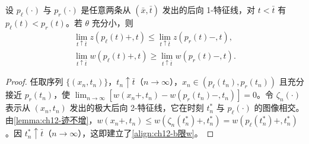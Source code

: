 \documentclass[../../main.tex]{subfiles}
\begin{document}
\begin{lemma}\label{lemma:ch12-后向特征极限}
设 $p_\ell(\cdot)$ 与 $p_r(\cdot)$ 是任意两条从 $(\bar x,\bar t)$ 发出的后向 1-特征线，对 $t<\bar t$ 有 $p_\ell(t)<p_r(t)$。若 $\theta$ 充分小，则
\begin{align}
\lim_{t\uparrow\bar t}z(p_\ell(t)+,t)\leqslant\lim_{t\uparrow\bar t}z(p_r(t)-,t),
\label{align:ch12-b限z}\\
\lim_{t\uparrow\bar t}w(p_\ell(t)+,t)\geqslant\lim_{t\uparrow\bar t}w(p_r(t)-,t).
\label{align:ch12-b限w}
\end{align}
\end{lemma}

\begin{proof}
任取序列 $\{(x_n,t_n)\}$，$t_n\uparrow\bar t$（$n\to\infty$），$x_n\in(p_\ell(t_n),p_r(t_n))$ 且充分接近 $p_r(t_n)$，使 $\lim_{n\to\infty}[w(x_n+,t_n)-w(p_r(t_n)-,t_n)]=0$。令 $\zeta_n(\cdot)$ 表示从 $(x_n,t_n)$ 发出的极大后向 2-特征线，它在时刻 $t_n^*$ 与 $p_\ell(\cdot)$ 的图像相交。由\cref{lemma:ch12-迹不增}，$w(x_n+,t_n)\leqslant w(\zeta_n(t_n^*)+,t_n^*)=w(p_\ell(t_n^*)+,t_n^*)$。因 $t_n^*\uparrow\bar t$（$n\to\infty$），这即建立了\eqref{align:ch12-b限w}。


\end{proof}
\end{document}
